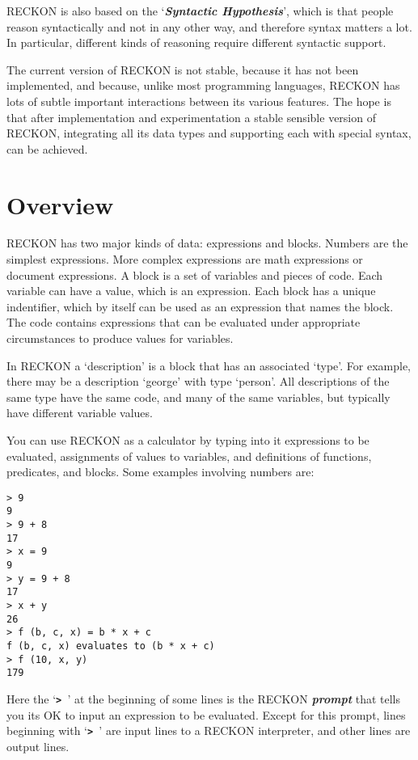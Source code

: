 \documentclass[12pt]{article}
\newcommand{\TT}[1]{{\tt \bfseries #1}}
\newcommand{\key}[1]{{\bf \em #1}\index{#1}}
\newenvironment{indpar}[1][0.3in]%
	{\begin{list}{}%
		     {\setlength{\itemsep}{0in}%
		      \setlength{\topsep}{0in}%
		      \setlength{\parsep}{1ex}%
		      \setlength{\labelwidth}{#1}%
		      \setlength{\leftmargin}{#1}%
		      \addtolength{\leftmargin}{\labelsep}}%
	 \item}%
	{\end{list}}
\begin{document}
RECKON is also based on the `\key{Syntactic Hypothesis}', which is that
people reason syntactically and not in any other way, and therefore
syntax matters a lot.  In particular, different kinds of reasoning
require different syntactic support.

The current version of RECKON is not stable, because it has not been
implemented, and because, unlike most programming languages, RECKON
has lots of subtle important interactions between its various features.  The
hope is that after implementation and experimentation a stable sensible
version of RECKON, integrating all its data types and supporting each
with special syntax, can be achieved.

\section{Overview}

RECKON has two major kinds of data: expressions and blocks.  Numbers are
the simplest expressions.  More complex expressions are math
expressions or document expressions.  A block is a set of variables
and pieces of code.  Each variable can have a value, which is an expression.
Each block has a unique indentifier, which by itself can be used as
an expression that names the block.
The code contains expressions that can be evaluated under appropriate
circumstances to produce values for variables.

In RECKON a `description' is a block that has an associated `type'.  For
example, there may be a description `george' with type `person'.  All
descriptions of the same type have the same code,
and many of the same variables,
but typically have different variable values.

You can use RECKON as a calculator by typing into it expressions to
be evaluated, assignments of values to variables, and definitions
of functions, predicates, and blocks.  Some examples involving numbers are:

\begin{indpar}\begin{verbatim}
> 9
9
> 9 + 8
17
> x = 9
9
> y = 9 + 8
17
> x + y
26
> f (b, c, x) = b * x + c
f (b, c, x) evaluates to (b * x + c)
> f (10, x, y)
179
\end{verbatim}\end{indpar}

Here the `\TT{>~}' at the beginning of some lines is the RECKON \key{prompt}
that tells you its OK to input an expression to be evaluated.
Except for this prompt, lines beginning with `\TT{> }' are input lines to
a RECKON interpreter, and other lines are output lines.
\end{document}
